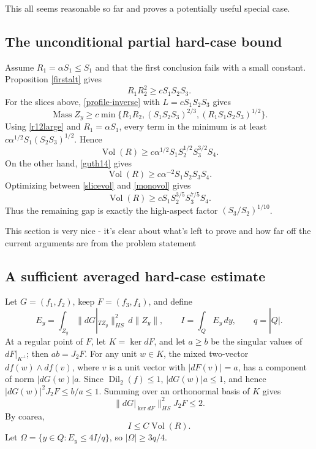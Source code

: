 \documentclass[12pt]{article}
\newcommand{\Dil}{\operatorname{Dil}}
\newcommand{\Vol}{\operatorname{Vol}}
\newcommand{\Mass}{\operatorname{Mass}}
\newcommand{\review}[1]{\begin{reviewbox}#1\end{reviewbox}}
\begin{document}
\review{This all seems reasonable so far and proves a potentially useful special case.}

\subsection*{The unconditional partial hard-case bound}

Assume \(R_1=\alpha S_1\le S_1\) and that the first conclusion fails with a
small constant.  Proposition \ref{firstalt} gives
\begin{equation}\label{r12large}
        R_1R_2^2\ge cS_1S_2S_3 .
\end{equation}
For the slices above, \eqref{profile-inverse} with
\(L=cS_1S_2S_3\) gives
\[
\Mass Z_y\ge c\min\{R_1R_2,(S_1S_2S_3)^{2/3},
                         (R_1S_1S_2S_3)^{1/2}\}.
\]
Using \eqref{r12large} and \(R_1=\alpha S_1\), every term in the minimum is
at least \(c\alpha^{1/2}S_1(S_2S_3)^{1/2}\).  Hence
\begin{equation}\label{slicevol}
        \Vol(R)\ge
        c\alpha^{1/2}S_1S_2^{1/2}S_3^{3/2}S_4 .
\end{equation}
On the other hand, \eqref{guth14} gives
\begin{equation}\label{monovol}
        \Vol(R)\ge
        c\alpha^{-2}S_1S_2S_3S_4 .
\end{equation}
Optimizing between \eqref{slicevol} and \eqref{monovol} gives
\[
        \Vol(R)\ge cS_1S_2^{3/5}S_3^{7/5}S_4 .
\]
Thus the remaining gap is exactly the high-aspect factor
\((S_3/S_2)^{1/10}\).

\review{This section is very nice - it's clear about what's left to prove and how far off the current arguments are from the problem statement}

\subsection*{A sufficient averaged hard-case estimate}

Let \(G=(f_1,f_2)\), keep \(F=(f_3,f_4)\), and define
\[
E_y=\int_{Z_y}\|dG|_{TZ_y}\|_{HS}^2\,d\|Z_y\|,\qquad
I=\int_QE_y\,dy,\qquad q=|Q|.
\]
At a regular point of \(F\), let \(K=\ker dF\), and let \(a\ge b\) be the
singular values of \(dF|_{K^\perp}\); then \(ab=J_2F\).  For any unit
\(w\in K\), the mixed two-vector \(df(w)\wedge df(v)\), where \(v\) is a
unit vector with \(|dF(v)|=a\), has a component of norm
\(|dG(w)|a\).  Since \(\Dil_2(f)\le1\), \(|dG(w)|a\le1\), and hence
\(|dG(w)|^2J_2F\le b/a\le1\).  Summing over an orthonormal basis of \(K\)
gives
\[
        \|dG|_{\ker dF}\|_{HS}^2J_2F\le2 .
\]
By coarea,
\begin{equation}\label{Icoarea}
        I\le C\Vol(R).
\end{equation}
Let \(\Omega=\{y\in Q:E_y\le4I/q\}\), so \(|\Omega|\ge3q/4\).
\end{document}
